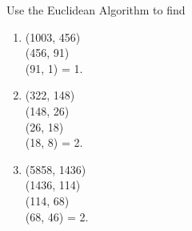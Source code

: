 \documentclass[../hw1]{subfiles}
\begin{document}
\begin{problem}[2]
Use the Euclidean Algorithm to find
\begin{enumerate}[label=\roman*)]
	\item (1003, 456) \\
	      (456, 91) \\
	      (91, 1) = 1.
	\item (322, 148) \\
	      (148, 26) \\
	      (26, 18) \\
	      (18, 8) = 2.
	\item (5858, 1436) \\
	      (1436, 114) \\
	      (114, 68) \\
	      (68, 46) = 2.
\end{enumerate}
\end{problem}
\end{document}
